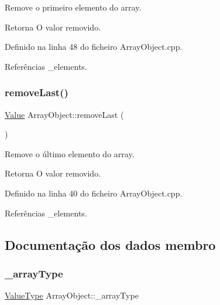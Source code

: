 Remove o primeiro elemento do array. 

\begin{DoxyReturn}{Retorna}
O valor removido. 
\end{DoxyReturn}


Definido na linha 48 do ficheiro Array\+Object.\+cpp.



Referências \+\_\+elements.

\mbox{\label{classArrayObject_a5235153943129699da298a3ecc7cfa14}} 
\subsubsection{\texorpdfstring{remove\+Last()}{removeLast()}}
{\footnotesize\ttfamily \hyperlink{structValue}{Value} Array\+Object\+::remove\+Last (\begin{DoxyParamCaption}{ }\end{DoxyParamCaption})}



Remove o último elemento do array. 

\begin{DoxyReturn}{Retorna}
O valor removido. 
\end{DoxyReturn}


Definido na linha 40 do ficheiro Array\+Object.\+cpp.



Referências \+\_\+elements.



\subsection{Documentação dos dados membro}
\mbox{\label{classArrayObject_a83a4c777ec1059f3e85aaa698442f72b}} 
\subsubsection{\texorpdfstring{\+\_\+array\+Type}{\_arrayType}}
{\footnotesize\ttfamily \hyperlink{BasicTypes_8h_ad9971b6ef33e02ba2c75d19c1d2518a1}{Value\+Type} Array\+Object\+::\+\_\+array\+Type\hspace{0.3cm}{\ttfamily [private]}}

